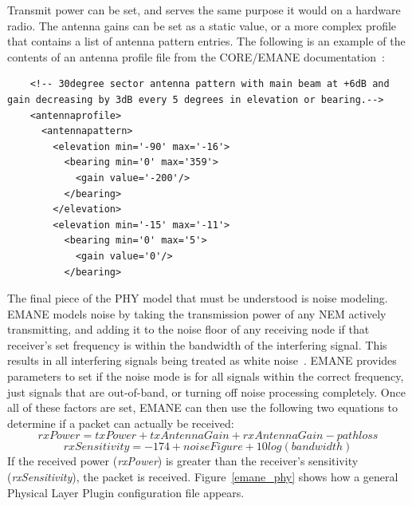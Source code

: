 Transmit power can be set, and serves the same purpose it would on a hardware radio.
The antenna gains can be set as a static value, or a more complex profile that contains a list of antenna pattern entries.
The following is an example of the contents of an antenna profile file from the CORE/EMANE documentation~\cite{core}:
\begin{center}
\begin{minipage}{\textwidth}
    \begin{verbatim}
    <!-- 30degree sector antenna pattern with main beam at +6dB and gain decreasing by 3dB every 5 degrees in elevation or bearing.-->
    <antennaprofile>
      <antennapattern>
        <elevation min='-90' max='-16'>
          <bearing min='0' max='359'>
            <gain value='-200'/>
          </bearing>
        </elevation>
        <elevation min='-15' max='-11'>
          <bearing min='0' max='5'>
            <gain value='0'/>
          </bearing>
    \end{verbatim}
\end{minipage}
\end{center}\par
The final piece of the PHY model that must be understood is noise modeling.
EMANE models noise by taking the transmission power of any NEM actively transmitting, and adding it to the noise floor of any receiving node if that receiver's set frequency is within the bandwidth of the interfering signal.
This results in all interfering signals being treated as white noise~\cite{emane_phy}.
EMANE provides parameters to set if the noise mode is for all signals within the correct frequency, just signals that are out-of-band, or turning off noise processing completely.
Once all of these factors are set, EMANE can then use the following two equations to determine if a packet can actually be received:
\[ rxPower = txPower + txAntennaGain + rxAntennaGain - pathloss \]
\[ rxSensitivity = -174 + noiseFigure + 10log(bandwidth) \]
If the received power (\textit{rxPower}) is greater than the receiver's sensitivity (\textit{rxSensitivity}), the packet is received.
Figure~\ref{emane_phy} shows how a general Physical Layer Plugin configuration file appears.\par


